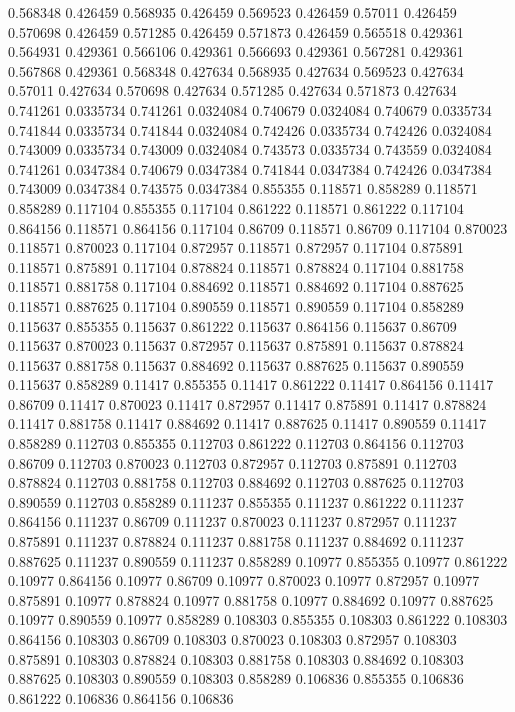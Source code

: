 0.568348 0.426459
0.568935 0.426459
0.569523 0.426459
0.57011 0.426459
0.570698 0.426459
0.571285 0.426459
0.571873 0.426459
0.565518 0.429361
0.564931 0.429361
0.566106 0.429361
0.566693 0.429361
0.567281 0.429361
0.567868 0.429361
0.568348 0.427634
0.568935 0.427634
0.569523 0.427634
0.57011 0.427634
0.570698 0.427634
0.571285 0.427634
0.571873 0.427634
0.741261 0.0335734
0.741261 0.0324084
0.740679 0.0324084
0.740679 0.0335734
0.741844 0.0335734
0.741844 0.0324084
0.742426 0.0335734
0.742426 0.0324084
0.743009 0.0335734
0.743009 0.0324084
0.743573 0.0335734
0.743559 0.0324084
0.741261 0.0347384
0.740679 0.0347384
0.741844 0.0347384
0.742426 0.0347384
0.743009 0.0347384
0.743575 0.0347384
0.855355 0.118571
0.858289 0.118571
0.858289 0.117104
0.855355 0.117104
0.861222 0.118571
0.861222 0.117104
0.864156 0.118571
0.864156 0.117104
0.86709 0.118571
0.86709 0.117104
0.870023 0.118571
0.870023 0.117104
0.872957 0.118571
0.872957 0.117104
0.875891 0.118571
0.875891 0.117104
0.878824 0.118571
0.878824 0.117104
0.881758 0.118571
0.881758 0.117104
0.884692 0.118571
0.884692 0.117104
0.887625 0.118571
0.887625 0.117104
0.890559 0.118571
0.890559 0.117104
0.858289 0.115637
0.855355 0.115637
0.861222 0.115637
0.864156 0.115637
0.86709 0.115637
0.870023 0.115637
0.872957 0.115637
0.875891 0.115637
0.878824 0.115637
0.881758 0.115637
0.884692 0.115637
0.887625 0.115637
0.890559 0.115637
0.858289 0.11417
0.855355 0.11417
0.861222 0.11417
0.864156 0.11417
0.86709 0.11417
0.870023 0.11417
0.872957 0.11417
0.875891 0.11417
0.878824 0.11417
0.881758 0.11417
0.884692 0.11417
0.887625 0.11417
0.890559 0.11417
0.858289 0.112703
0.855355 0.112703
0.861222 0.112703
0.864156 0.112703
0.86709 0.112703
0.870023 0.112703
0.872957 0.112703
0.875891 0.112703
0.878824 0.112703
0.881758 0.112703
0.884692 0.112703
0.887625 0.112703
0.890559 0.112703
0.858289 0.111237
0.855355 0.111237
0.861222 0.111237
0.864156 0.111237
0.86709 0.111237
0.870023 0.111237
0.872957 0.111237
0.875891 0.111237
0.878824 0.111237
0.881758 0.111237
0.884692 0.111237
0.887625 0.111237
0.890559 0.111237
0.858289 0.10977
0.855355 0.10977
0.861222 0.10977
0.864156 0.10977
0.86709 0.10977
0.870023 0.10977
0.872957 0.10977
0.875891 0.10977
0.878824 0.10977
0.881758 0.10977
0.884692 0.10977
0.887625 0.10977
0.890559 0.10977
0.858289 0.108303
0.855355 0.108303
0.861222 0.108303
0.864156 0.108303
0.86709 0.108303
0.870023 0.108303
0.872957 0.108303
0.875891 0.108303
0.878824 0.108303
0.881758 0.108303
0.884692 0.108303
0.887625 0.108303
0.890559 0.108303
0.858289 0.106836
0.855355 0.106836
0.861222 0.106836
0.864156 0.106836

